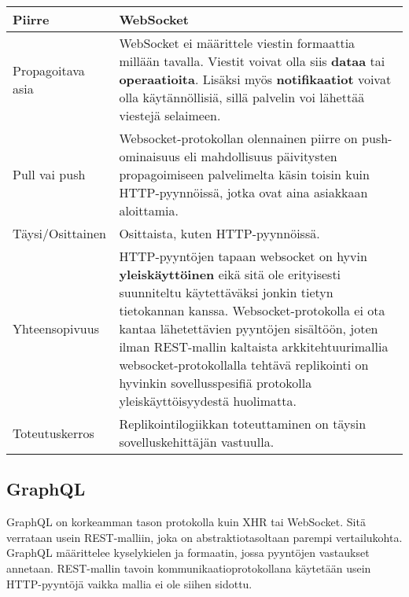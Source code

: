 \documentclass[finnish,twoside,censored,csm,sw-track-2018]{HYthesisML}
\begin{document}
\begin{center}
\begin{tabular}{ | m{3.3cm} | m{11.7cm} | }
 \hline
 \textbf{Piirre} & \textbf{WebSocket}\\ 
 \hline
 Propagoitava asia & WebSocket ei määrittele viestin formaattia millään tavalla. Viestit voivat olla siis \textbf{dataa} tai \textbf{operaatioita}. Lisäksi myös \textbf{notifikaatiot} voivat olla käytännöllisiä, sillä palvelin voi lähettää viestejä selaimeen. \\
 \hline
 Pull vai push & Websocket-protokollan olennainen piirre on {push}-ominaisuus eli mahdollisuus päivitysten propagoimiseen palvelimelta käsin toisin kuin HTTP-pyynnöissä, jotka ovat aina asiakkaan aloittamia. \\
 \hline
 Täysi/Osittainen & Osittaista, kuten HTTP-pyynnöissä. \\
 \hline
 Yhteensopivuus & HTTP-pyyntöjen tapaan websocket on hyvin \textbf{yleiskäyttöinen} eikä sitä ole erityisesti suunniteltu käytettäväksi jonkin tietyn tietokannan kanssa. Websocket-protokolla ei ota kantaa lähetettävien pyyntöjen sisältöön, joten ilman REST-mallin kaltaista arkkitehtuurimallia websocket-protokollalla tehtävä replikointi on hyvinkin sovellusspesifiä protokolla yleiskäyttöisyydestä huolimatta. \\
 \hline
 Toteutuskerros & Replikointilogiikkan toteuttaminen on täysin sovelluskehittäjän vastuulla. \\
 \hline
\end{tabular}
\label{table-websocket}
\end{center}

\subsection{GraphQL}

GraphQL \citep{graphql} on korkeamman tason protokolla kuin XHR tai WebSocket. Sitä verrataan usein REST-malliin, joka on abstraktiotasoltaan parempi vertailukohta. GraphQL määrittelee kyselykielen ja formaatin, jossa pyyntöjen vastaukset annetaan. REST-mallin tavoin kommunikaatioprotokollana käytetään usein HTTP-pyyntöjä vaikka mallia ei ole siihen sidottu.
\end{document}
